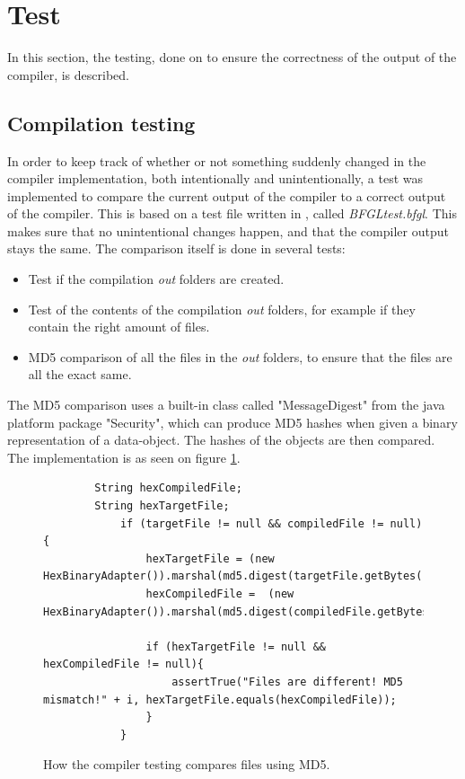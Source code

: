 \section{Test}\label{Test}
In this section, the testing, done on \lang{} to ensure the correctness of the output of the compiler, is described. 
\subsection{Compilation testing}
In order to keep track of whether or not something suddenly changed in the compiler implementation, both intentionally and unintentionally, a test was implemented to compare the current output of the compiler to a correct output of the compiler. This is based on a test file written in \lang{}, called \textit{BFGLtest.bfgl}. This makes sure that no unintentional changes happen, and that the compiler output stays the same. 
The comparison itself is done in several tests:
\begin{itemize}
    \item Test if the compilation \textit{out} folders are created.
    \item Test of the contents of the compilation \textit{out} folders, for example if they contain the right amount of files.
    \item MD5 comparison of all the files in the \textit{out} folders, to ensure that the files are all the exact same. 
\end{itemize}
The MD5 comparison uses a built-in class called "MessageDigest" from the java platform package "Security", which can produce MD5 hashes when given a binary representation of a data-object. The hashes of the objects are then compared. The implementation is as seen on figure \ref{fig:md5}.

\begin{figure}[H]
    \centering
    \begin{lstlisting}
        String hexCompiledFile;
        String hexTargetFile;
            if (targetFile != null && compiledFile != null){
                hexTargetFile = (new HexBinaryAdapter()).marshal(md5.digest(targetFile.getBytes()));
                hexCompiledFile =  (new HexBinaryAdapter()).marshal(md5.digest(compiledFile.getBytes()));

                if (hexTargetFile != null && hexCompiledFile != null){
                    assertTrue("Files are different! MD5 mismatch!" + i, hexTargetFile.equals(hexCompiledFile));
                }
            }
    \end{lstlisting}
    \caption{How the \lang{} compiler testing compares files using MD5.}\label{fig:md5}
\end{figure}

